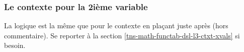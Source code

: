 \documentclass{tutodoc}
\begin{document}

\subsubsection{Le contexte  pour la 2ième variable}

La logique est la même que pour le contexte  en plaçant  juste après  (hors commentaire). Se reporter à la section \ref{tns-math-functab-dsl-l3-ctxt-xvals} si besoin.
\end{document}
